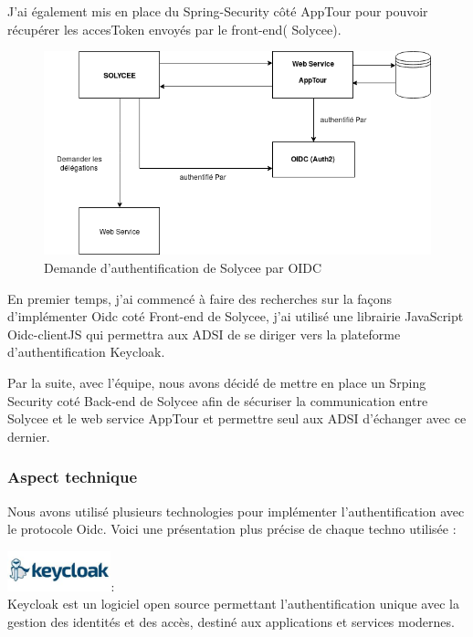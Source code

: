 \documentclass[12pt]{article}
\begin{document}
J'ai également mis en place du Spring-Security côté AppTour pour pouvoir récupérer les accesToken envoyés par le front-end( Solycee). 

\begin{figure}[H]
	\centering
 		\includegraphics[width=1\textwidth]{diagrammes/schemaOIDC2.png}
  		\caption{Demande d'authentification de Solycee par OIDC}\end{figure}	


En premier temps, j'ai commencé à faire des recherches sur la façons d'implémenter Oidc coté Front-end de Solycee, j'ai utilisé une librairie JavaScript Oidc-clientJS qui permettra aux ADSI de se diriger vers la plateforme d'authentification Keycloak.

Par la suite, avec l'équipe, nous avons décidé de mettre en place un Srping Security coté Back-end de Solycee afin de sécuriser la communication entre Solycee et le web service AppTour et permettre seul aux ADSI d'échanger avec ce dernier.  
 
\subsubsection{Aspect technique}

Nous avons utilisé plusieurs technologies pour implémenter l'authentification avec le protocole Oidc. Voici une présentation plus précise de chaque techno utilisée : 

\includegraphics[width=30mm,scale=0.5]{diagrammes/logo_Keycloak.jpeg}: \\

Keycloak  est un logiciel open source permettant l'authentification unique avec la gestion des identités et des accès, destiné aux applications et services modernes. 
\end{document}
